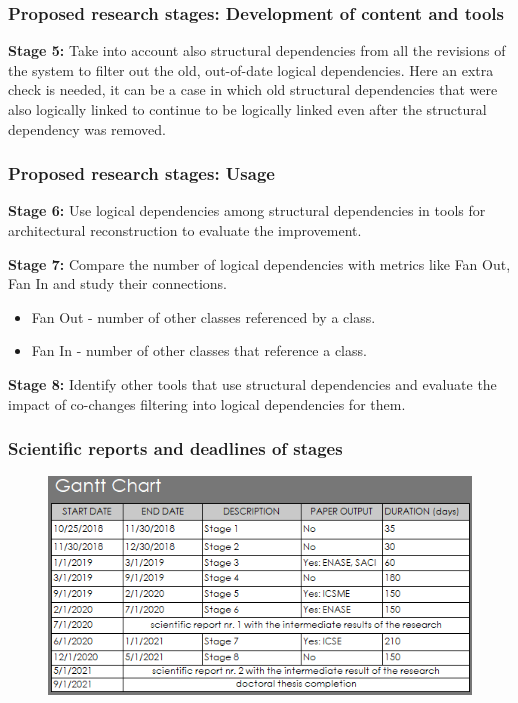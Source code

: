 \documentclass{beamer}
\begin{document}

 \begin{frame}
\frametitle{Proposed research stages: Development of content and tools }

\textbf{Stage 5:} Take into account also structural dependencies from all the revisions of the system to filter out the old, out-of-date logical dependencies. Here an extra check is needed, it can be a case in which old structural dependencies that were also logically linked to continue to be logically linked
even after the structural dependency was removed.

\end{frame}


 \begin{frame}
\frametitle{Proposed research stages: Usage }

\textbf{Stage 6:} Use logical dependencies among structural dependencies in tools for architectural reconstruction to evaluate the improvement.

\textbf{Stage 7:} Compare the number of logical dependencies with metrics like Fan Out, Fan In and study their connections.
\begin{itemize}
	\item  Fan Out - number of other classes referenced by a class.
	\item  Fan In - number of other classes that reference a class.
\end{itemize}

\textbf{Stage 8:} Identify other tools that use structural dependencies and evaluate the impact of co-changes filtering into logical dependencies for them.

\end{frame}


 \begin{frame}
\frametitle{ Scientific reports and deadlines of stages}

\begin{figure}[H]
\centering
\includegraphics[width=\textwidth]{gantt_chart.PNG}
\label{fig:gantt1}
\end{figure}

\end{frame}
\end{document}
